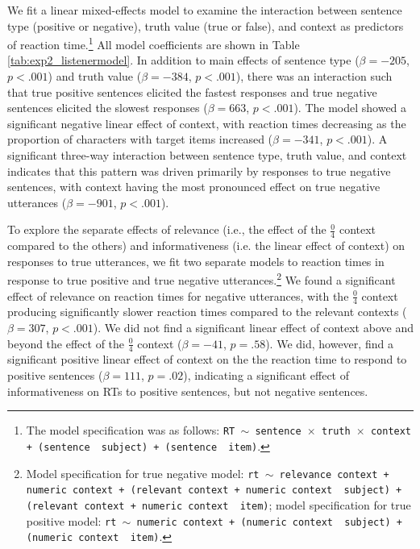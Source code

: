 \documentclass[man, floatsintext, noapacite]{apa6}
\begin{document}
We fit a linear mixed-effects model to examine the interaction between sentence type (positive or negative), truth value (true or false), and context as predictors of reaction time.\footnote{The model specification was as follows: \texttt{RT $\sim$ sentence~$\times$~truth~$\times$~context + (sentence~\textbar~subject) +  (sentence~\textbar~item)}.} All model coefficients are shown in Table \ref{tab:exp2_listenermodel}. In addition to main effects of sentence type ($\beta= -205$, $p< .001$) and truth value ($\beta= -384$, $p< .001$), there was an interaction such that true positive sentences elicited the fastest responses and true negative sentences elicited the slowest responses ($\beta= 663$, $p< .001$). The model showed a significant negative linear effect of context, with reaction times decreasing as the proportion of characters with target items increased ($\beta= -341$, $p< .001$). A significant three-way interaction between sentence type, truth value, and context indicates that this pattern was driven primarily by responses to true negative sentences, with context having the most pronounced effect on true negative utterances ($\beta= -901$, $p< .001$).  

To explore the separate effects of relevance (i.e., the effect of the $\frac{0}{4}$ context compared to the others) and informativeness (i.e. the linear effect of context) on responses to true utterances, we fit two separate models to reaction times in response to true positive and true negative utterances.\footnote{Model specification for true negative model: \texttt{rt $\sim$  relevance context + numeric context + (relevant context + numeric context~\textbar~subject) +  (relevant context + numeric context~\textbar~item)}; model specification for true positive model: \texttt{rt $\sim$  numeric context + (numeric context~\textbar~subject) +  (numeric context~\textbar~item)}.} We found a significant effect of relevance on reaction times for negative utterances, with the $\frac{0}{4}$ context producing significantly slower reaction times compared to the relevant contexts ($\beta= 307$, $p< .001$). We did not find a significant linear effect of context above and beyond the effect of the  $\frac{0}{4}$ context ($\beta= -41$, $p = .58$). We did, however, find a significant positive linear effect of context on the the reaction time to respond to positive sentences ($\beta= 111$, $p = .02$), indicating a significant effect of informativeness on RTs to positive sentences, but not negative sentences. 
\end{document}
